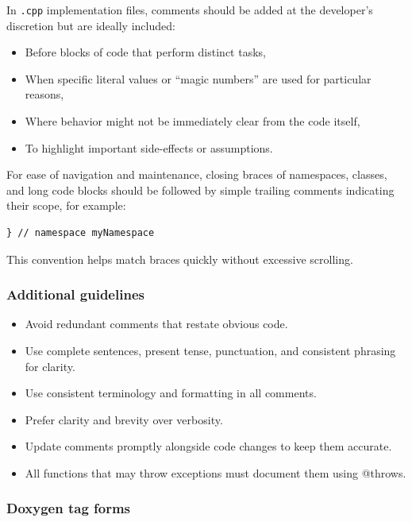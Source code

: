 In \texttt{.cpp} implementation files, comments should be added at the developer’s discretion but are ideally included:
\begin{itemize}\itemsep0em
    \item Before blocks of code that perform distinct tasks,
    \item When specific literal values or “magic numbers” are used for particular reasons,
    \item Where behavior might not be immediately clear from the code itself,
    \item To highlight important side-effects or assumptions.
\end{itemize}
For ease of navigation and maintenance, closing braces of namespaces, classes, and long code blocks should be followed by simple trailing comments indicating their scope, for example:
\begin{lstlisting}[style=cppstyle]
} // namespace myNamespace
\end{lstlisting}
This convention helps match braces quickly without excessive scrolling.

\subsubsection*{Additional guidelines}
\begin{itemize}\itemsep0em
    \item Avoid redundant comments that restate obvious code.
    \item Use complete sentences, present tense, punctuation, and consistent phrasing for clarity.
    \item Use consistent terminology and formatting in all comments.
    \item Prefer clarity and brevity over verbosity.
    \item Update comments promptly alongside code changes to keep them accurate.
    \item All functions that may throw exceptions must document them using @throws. 
\end{itemize}

\subsubsection*{Doxygen tag forms}

